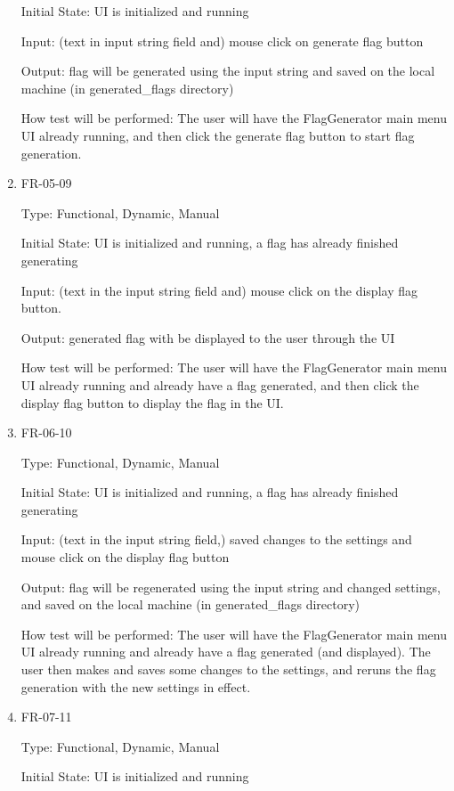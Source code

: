 \documentclass[12pt, titlepage]{article}
\begin{document}
\begin{enumerate}
Initial State: UI is initialized and running

Input: (text in input string field and) mouse click on generate flag button

Output: flag will be generated using the input string and saved on the local
machine (in \/generated\_flags directory)

How test will be performed: The user will have the FlagGenerator main menu UI
already running, and then click the generate flag button to start flag
generation.

\item{FR-05-09\\}

Type: Functional, Dynamic, Manual

Initial State: UI is initialized and running, a flag has already finished
generating

Input: (text in the input string field and) mouse click on the display flag
button.

Output: generated flag with be displayed to the user through the UI

How test will be performed: The user will have the FlagGenerator main menu UI
already running and already have a flag generated, and then click the display
flag button to display the flag in the UI.

\item{FR-06-10\\}

Type: Functional, Dynamic, Manual

Initial State: UI is initialized and running, a flag has already finished generating

Input: (text in the input string field,) saved changes to the settings and
mouse click on the display flag button

Output: flag will be regenerated using the input string and changed settings,
and saved on the local machine (in \/generated\_flags directory)

How test will be performed: The user will have the FlagGenerator main menu UI
already running and already have a flag generated (and displayed). The user
then makes and saves some changes to the settings, and reruns the flag
generation with the new settings in effect.

\item{FR-07-11\\}

Type: Functional, Dynamic, Manual

Initial State: UI is initialized and running


\end{enumerate}
\end{document}
